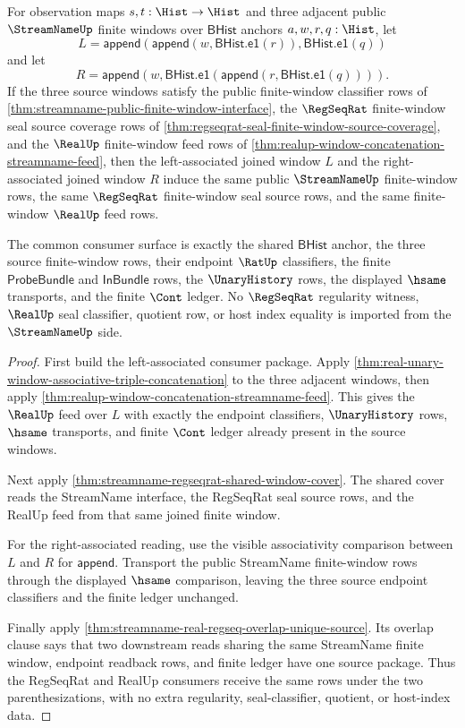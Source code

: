 \begin{theorem}
\label{thm:streamname-regseqrat-realup-joined-window-consumer-coherence}
For observation maps $s,t:\Hist\to\Hist$ and three adjacent public
$\StreamNameUp$ finite windows over $\mathsf{BHist}$ anchors
$a,w,r,q:\Hist$, let
$$
L=\mathsf{append}(\mathsf{append}(w,\mathsf{BHist.e1}(r)),
\mathsf{BHist.e1}(q))
$$
and let
$$
R=\mathsf{append}(w,\mathsf{BHist.e1}(\mathsf{append}(r,\mathsf{BHist.e1}(q)))).
$$
If the three source windows satisfy the public finite-window classifier rows
of \autoref{thm:streamname-public-finite-window-interface}, the
$\RegSeqRat$ finite-window seal source coverage rows of
\autoref{thm:regseqrat-seal-finite-window-source-coverage}, and the
$\RealUp$ finite-window feed rows of
\autoref{thm:realup-window-concatenation-streamname-feed}, then the
left-associated joined window $L$ and the right-associated joined window $R$
induce the same public $\StreamNameUp$ finite-window rows, the same
$\RegSeqRat$ finite-window seal source rows, and the same finite-window
$\RealUp$ feed rows.

The common consumer surface is exactly the shared $\mathsf{BHist}$ anchor,
the three source finite-window rows, their endpoint $\RatUp$ classifiers, the
finite $\mathsf{ProbeBundle}$ and $\mathsf{InBundle}$ rows, the
$\UnaryHistory$ rows, the displayed $\hsame$ transports, and the finite
$\Cont$ ledger. No $\RegSeqRat$ regularity witness, $\RealUp$ seal
classifier, quotient row, or host index equality is imported from the
$\StreamNameUp$ side.
\end{theorem}
\begin{proof}
First build the left-associated consumer package. Apply
\autoref{thm:real-unary-window-associative-triple-concatenation} to the three
adjacent windows, then apply
\autoref{thm:realup-window-concatenation-streamname-feed}. This gives the
$\RealUp$ feed over $L$ with exactly the endpoint classifiers,
$\UnaryHistory$ rows, $\hsame$ transports, and finite $\Cont$ ledger already
present in the source windows.

Next apply \autoref{thm:streamname-regseqrat-shared-window-cover}. The shared
cover reads the StreamName interface, the RegSeqRat seal source rows, and the
RealUp feed from that same joined finite window.

For the right-associated reading, use the visible associativity comparison
between $L$ and $R$ for $\mathsf{append}$. Transport the public StreamName
finite-window rows through the displayed $\hsame$ comparison, leaving the
three source endpoint classifiers and the finite ledger unchanged.

Finally apply
\autoref{thm:streamname-real-regseq-overlap-unique-source}. Its overlap
clause says that two downstream reads sharing the same StreamName finite
window, endpoint readback rows, and finite ledger have one source package.
Thus the RegSeqRat and RealUp consumers receive the same rows under the two
parenthesizations, with no extra regularity, seal-classifier, quotient, or
host-index data.
\end{proof}

